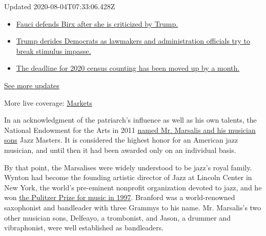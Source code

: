Updated 2020-08-04T07:33:06.428Z

\begin{itemize}
\tightlist
\item
  \href{https://www.nytimes.com/2020/08/03/world/coronavirus-covid-19.html?action=click\&pgtype=Article\&state=default\&region=MAIN_CONTENT_1\&context=storylines_live_updates\#link-4547638f}{Fauci
  defends Birx after she is criticized by Trump.}
\item
  \href{https://www.nytimes.com/2020/08/03/world/coronavirus-covid-19.html?action=click\&pgtype=Article\&state=default\&region=MAIN_CONTENT_1\&context=storylines_live_updates\#link-15e7f995}{Trump
  derides Democrats as lawmakers and administration officials try to
  break stimulus impasse.}
\item
  \href{https://www.nytimes.com/2020/08/03/world/coronavirus-covid-19.html?action=click\&pgtype=Article\&state=default\&region=MAIN_CONTENT_1\&context=storylines_live_updates\#link-e5a2cda}{The
  deadline for 2020 census counting has been moved up by a month.}
\end{itemize}

\href{https://www.nytimes.com/2020/08/03/world/coronavirus-covid-19.html?action=click\&pgtype=Article\&state=default\&region=MAIN_CONTENT_1\&context=storylines_live_updates}{See
more updates}

More live coverage:
\href{https://www.nytimes.com/live/2020/08/03/business/stock-market-today-coronavirus?action=click\&pgtype=Article\&state=default\&region=MAIN_CONTENT_1\&context=storylines_live_updates}{Markets}

In an acknowledgment of the patriarch's influence as well as his own
talents, the National Endowment for the Arts in 2011
\href{https://www.nytimes.com/2011/01/13/arts/music/13nea.html}{named
Mr. Marsalis and his musician sons} Jazz Masters. It is considered the
highest honor for an American jazz musician, and until then it had been
awarded only on an individual basis.

By that point, the Marsalises were widely understood to be jazz's royal
family. Wynton had become the founding artistic director of Jazz at
Lincoln Center in New York, the world's pre-eminent nonprofit
organization devoted to jazz, and he won
\href{https://www.pulitzer.org/winners/wynton-marsalis}{the Pulitzer
Prize for music in 1997}. Branford was a world-renowned saxophonist and
bandleader with three Grammys to his name. Mr. Marsalis's two other
musician sons, Delfeayo, a trombonist, and Jason, a drummer and
vibraphonist, were well established as bandleaders.

